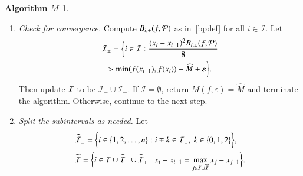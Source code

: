 \documentclass[review]{elsarticle}
\newcommand{\abstol}{\varepsilon}
\theoremstyle{definition}
\newtheorem*{algoM}{Algorithm $M$}
\newcommand{\minfii}{\min(f(x_{i-1}), f(x_i))} %
\begin{document}
\begin{algoM}
	\begin{enumerate}[\em Step 1.]%
		\item \label{stagemin1} \emph{Check for convergence.}
		Compute $B_{i,\pm}(f,\mathcal{P})$ as in~\eqref{bpdef} for all $i \in \mathcal{I}$.
		Let
		\begin{multline*}
		\mathcal{I}_\pm = \biggl\{i \in \mathcal{I}:  \frac{(x_i - x_{i-1})^2B_{i,\pm}(f,\cp)}{8}  \\
		> \minfii - \widehat{M} + \abstol \biggr\}.
		\end{multline*}
		Then update $\mathcal{I}$ to be $\mathcal{I}_+ \cup \mathcal{I}_-$. If $\mathcal{I} =
		\emptyset$, return $M(f,\abstol) = \widehat{M}$ and terminate the algorithm.
		Otherwise, continue to the next step.
		\item \label{stagemin2} \emph{Split the subintervals as needed.}
		Let
		\begin{gather*}
		\widehat{\mathcal{I}}_{\pm} = \biggl\{i \in \{1,2,\ldots,n\}: i\mp k \in \mathcal{I}_{\pm}, \ k \in \{0,1,2\}   \biggr\}, \quad  \\
		\widetilde{\mathcal{I}}=\biggl\{i \in \mathcal{I} \cup \widehat{\mathcal{I}}_- \cup \widehat{\mathcal{I}}_+ : x_i - x_{i-1}=\max\limits_{j \in \mathcal{I} \cup \widehat{\mathcal{I}} } x_j-x_{j-1} \biggr\}.
		\end{gather*}

\end{enumerate}
\end{algoM}
\end{document}
